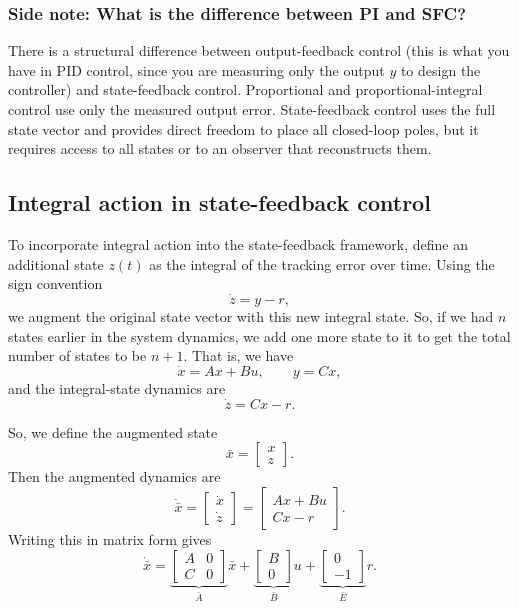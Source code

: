 \documentclass{ee122_notes}
\begin{document}
\subsubsection{Side note: What is the difference between PI and SFC?}
There is a structural difference between output-feedback control (this is what you have in PID control, since you are measuring only the output $y$ to design the controller) and state-feedback control. Proportional and proportional-integral control use only the measured output error. State-feedback control uses the full state vector and provides direct freedom to place all closed-loop poles, but it requires access to all states or to an observer that reconstructs them.

\subsection{Integral action in state-feedback control}

To incorporate integral action into the state-feedback framework, define an additional state \(z(t)\) as the integral of the tracking error over time. Using the sign convention
\[
\dot z =y -r,
\]
we augment the original state vector with this new integral state. So, if we had $n$ states earlier in the system dynamics, we add one more state to it to get the total number of states to be $n+1$. That is, we have
\[
\dot x = Ax+Bu,
\qquad
y=Cx,
\]
and the integral-state dynamics are
\[
\dot z = Cx-r.
\]

So, we define the augmented state
\[
\bar x =
\begin{bmatrix}
x\\
z
\end{bmatrix}.
\]
Then the augmented dynamics are
\[
\dot{\bar{x}} = \begin{bmatrix}
\dot x\\
\dot z
\end{bmatrix}
=
\begin{bmatrix}
Ax+Bu\\
Cx-r
\end{bmatrix}.
\]
Writing this in matrix form gives
\[
\dot{\bar{x}}
=
\underbrace{
\begin{bmatrix}
A & 0\\
C & 0
\end{bmatrix}}_{\bar{A}}
\bar{x}
+
\underbrace{
\begin{bmatrix}
B\\
0
\end{bmatrix}}_{\bar{B}}u
+
\underbrace{
\begin{bmatrix}
0\\
-1
\end{bmatrix}}_{\bar{E}}r.
\]
\end{document}
